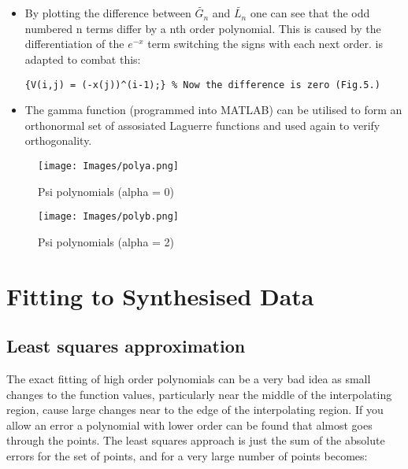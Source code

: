 \documentclass{article}
\begin{document}
\begin{itemize}

\item By plotting the difference between $\tilde{G_n}$ and $\tilde{L_n}$ one can see that the odd numbered n terms differ by a nth order polynomial. This is caused by the differentiation of the $e^{-x}$ term switching the signs with each next order.  is adapted to combat this:

\begin{lstlisting}
{V(i,j) = (-x(j))^(i-1);} % Now the difference is zero (Fig.5.)
\end{lstlisting}


\item The gamma function (programmed into MATLAB) can be utilised to form an orthonormal set of assosiated Laguerre functions and  used again to verify orthogonality.

\end{itemize}

\begin{figure}[h]
\centering
	\begin{minipage}[c][][b]{0.45\linewidth}
		\begin{center}
		\texttt{[image: Images/polya.png]}  
		\end{center}
		\caption[b]{Psi polynomials (alpha = 0)}
		\label{fourierapproximationtriangle}
	\end{minipage}
\quad\quad\quad\quad
	\begin{minipage}[c][][b]{0.45\linewidth}
		\begin{center}
		\texttt{[image: Images/polyb.png]}
		\end{center}
		\caption[b]{Psi polynomials (alpha = 2)}
		\label{numberoffourierterms}
	\end{minipage}
\end{figure}


\section{Fitting to Synthesised Data}

\subsection{Least squares approximation}

The exact fitting of high order polynomials can be a very bad idea as small changes to the function values, particularly near the middle of the interpolating region, cause large changes near to the edge of the interpolating region. If you allow an error a polynomial with lower order can be found that almost goes through the points. The least squares approach is just the sum of the absolute errors for the set of points, and for a very large number of points becomes:
\end{document}

